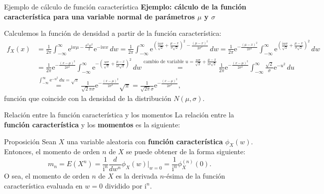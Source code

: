\documentclass[
  ignorenonframetext,
  aspectratio=169]{beamer}
\begin{document}
\begin{frame}{Ejemplo de cálculo de función característica}
\protect\hypertarget{ejemplo-de-cuxe1lculo-de-funciuxf3n-caracteruxedstica-3}{}
\textbf{Ejemplo: cálculo de la función característica para una variable
normal de parámetros \(\mu\) y \(\sigma\)}

Calculemos la función de densidad a partir de la función característica:
\[
\begin{array}{rl}
f_X(x) & =\frac{1}{2\pi}\int_{-\infty}^\infty \mathrm{e}^{ \mathrm{i}w \mu -\frac{\sigma^2 w^2}{2}}\mathrm{e}^{-\mathrm{i} w x}\, dw = \frac{1}{2\pi}\int_{-\infty}^\infty \mathrm{e}^{\left(\frac{\mathrm{i}w\sigma}{\sqrt{2}}+\frac{\mu-x}{\sigma\sqrt{2}}\right)^2-\frac{(\mu-x)^2}{2\sigma^2}}\, dw =\frac{1}{2\pi}\mathrm{e}^{-\frac{(\mu-x)^2}{2\sigma^2}}\int_{-\infty}^\infty \mathrm{e}^{\left(\frac{\mathrm{i}w\sigma}{\sqrt{2}}+\frac{\mu-x}{\sigma\sqrt{2}}\right)^2}\, dw \\ & = \frac{1}{2\pi}\mathrm{e}^{-\frac{(x-\mu)^2}{2\sigma^2}}\int_{-\infty}^\infty \mathrm{e}^{-\left(\frac{w\sigma}{\sqrt{2}}+\frac{\mu-x}{\mathrm{i}\sigma\sqrt{2}}\right)^2}\, dw \stackrel{\mbox{cambio de variable } u=\frac{w\sigma}{\sqrt{2}}+\frac{\mu-x}{\mathrm{i}\sigma\sqrt{2}}}{=} \frac{1}{2\pi}\mathrm{e}^{-\frac{(x-\mu)^2}{2\sigma^2}}\int_{-\infty}^\infty \frac{\sqrt{2}}{\sigma}\mathrm{e}^{-u^2}\, du \\ & \stackrel{\int_{-\infty}^\infty \mathrm{e}^{-u^2}\, du =\sqrt{\pi}}{=} \frac{1}{\sqrt{2}\pi\sigma} \mathrm{e}^{-\frac{(x-\mu)^2}{2\sigma^2}} \sqrt{\pi} = \frac{1}{\sqrt{2\pi}\sigma}\mathrm{e}^{-\frac{(x-\mu)^2}{2\sigma^2}},
\end{array}
\] función que coincide con la densidad de la distribución
\(N(\mu,\sigma)\).
\end{frame}

\begin{frame}{Relación entre la función característica y los momentos}
\protect\hypertarget{relaciuxf3n-entre-la-funciuxf3n-caracteruxedstica-y-los-momentos}{}
La relación entre la \textbf{función característica} y los
\textbf{momentos} es la siguiente:

Proposición Sean \(X\) una variable aleatoria con \textbf{función
característica} \(\phi_X(w)\). Entonces, el momento de orden \(n\) de
\(X\) se puede obtener de la forma siguiente: \[
m_n =E\left(X^n\right)=\frac{1}{\mathrm{i}^n}\frac{d}{d w^n}\phi_X(w)|_{w=0} =\frac{1}{\mathrm{i}^n}\phi_X^{(n)}(0).
\] O sea, el momento de orden \(n\) de \(X\) es la derivada \(n\)-ésima
de la función característica evaluada en \(w=0\) dividido por
\(\mathrm{i}^n\).
\end{frame}
\end{document}

